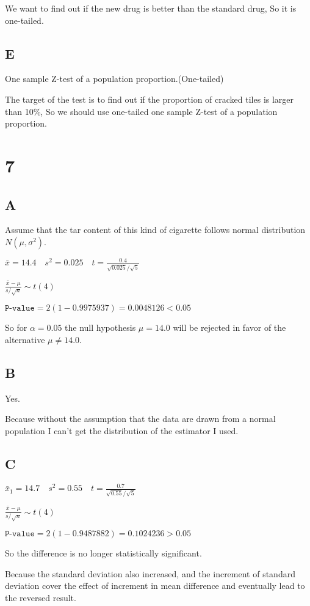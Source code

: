 \documentclass{article}
\begin{document}
We want to find out if the new drug is better than the standard drug, So it is one-tailed.


\subsection*{E}
One sample Z-test of a population proportion.(One-tailed)

The target of the test is to find out if the proportion of cracked tiles is larger than 10\%, So we should use one-tailed one sample Z-test of a population proportion.

\section*{7}
\subsection*{A}
Assume that the tar content of this kind of cigarette follows normal distribution $N(\mu,\sigma^2)$.

$\bar{x}=14.4\quad s^2=0.025\quad t=\frac{0.4}{\sqrt{0.025}/\sqrt{5}}$

$\frac{\bar{x}-\mu}{s/\sqrt{n}}\sim t(4)$

$\texttt{P-value}=2(1-0.9975937)=0.0048126<0.05$

So for $\alpha=0.05$ the null hypothesis $\mu=14.0$ will be rejected in favor of the
alternative $\mu\ne 14.0$.

\subsection*{B}
Yes.

Because without the assumption that the data are drawn from a normal population I can't get the distribution of the estimator I used.
\subsection*{C}
$\bar{x}_1=14.7\quad s^2=0.55\quad t=\frac{0.7}{\sqrt{0.55}/\sqrt{5}}$

$\frac{\bar{x}-\mu}{s/\sqrt{n}}\sim t(4)$

$\texttt{P-value}=2(1-0.9487882)=0.1024236>0.05$

So the difference is no longer statistically significant.

Because the standard deviation also increased, and the increment of standard deviation cover the effect of increment in mean difference and eventually lead to the reversed result. 
\end{document}
